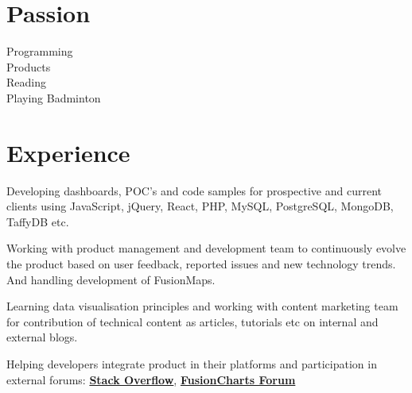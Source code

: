 \documentclass[]{gagan-resume}
\begin{document}
\begin{minipage}[t]{0.33\textwidth}

\section{Passion}
Programming \\
Products \\
Reading \\
Playing Badminton \\
\sectionsep



\end{minipage} 
\hfill
\begin{minipage}[t]{0.66\textwidth}


\section{Experience}

\vspace{\topsep} %
\begin{tightemize}
\item Developing dashboards, POC’s and code samples for prospective and current clients using JavaScript, jQuery, React, PHP, MySQL, PostgreSQL, MongoDB, TaffyDB etc.
\item Working with product management and development team to continuously evolve the product based on user feedback, reported issues and new technology trends. And handling development of FusionMaps.
\item Learning data visualisation principles and working with content marketing team for contribution of technical content as articles, tutorials etc on internal and external blogs.
\item Helping developers integrate product in their platforms and participation in external forums: \textbf{\href{https://stackoverflow.com/users/4129965/sikrigagan}{Stack Overflow}}, \textbf{\href{http://forum.fusioncharts.com/profile/67674-gagan-sikri/}{FusionCharts Forum}} 
\end{tightemize}
\sectionsep


\end{minipage}
\end{document}
